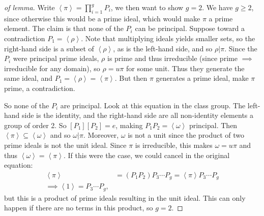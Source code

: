 \begin{proof}[of lemma]

Write \(\left\langle{ \pi }\right\rangle= \prod_{i=1}^g P_i\), we then
want to show \(g=2\). We have \(g\geq 2\), since otherwise this would be
a prime ideal, which would make \(\pi\) a prime element. The claim is
that none of the \(P_i\) can be principal. Suppose toward a
contradiction \(P_1 = \left\langle{ \rho }\right\rangle\). Note that
multiplying ideals yields smaller sets, so the right-hand side is a
subset of \(\left\langle{ \rho }\right\rangle\), as is the left-hand
side, and so \(\rho \mathrel{\Big|}\pi\). Since the \(P_i\) were
principal prime ideals, \(\rho\) is prime and thus irreducible (since
prime \(\implies\) irreducible for any domain), so \(\rho = u \pi\) for
some unit. Thus they generate the same ideal, and
\(P_1 = \left\langle{ \rho }\right\rangle = \left\langle{ \pi }\right\rangle\).
But then \(\pi\) generates a prime ideal, make \(\pi\) prime, a
contradiction.

So none of the \(P_i\) are principal. Look at this equation in the class
group. The left-hand side is the identity, and the right-hand side are
all non-identity elements a group of order 2. So \([P_1][P_2] = e\),
making \(P_1 P_2 = \left\langle{ \omega }\right\rangle\) principal. Then
\(\left\langle{ \pi }\right\rangle\subseteq \left\langle{ \omega }\right\rangle\)
and so \(\omega \mathrel{\Big|}\pi\). Moreover, \(\omega\) is not a unit
since the product of two prime ideals is not the unit ideal. Since
\(\pi\) is irreducible, this makes \(\omega= u \pi\) and thus
\(\left\langle{ \omega }\right\rangle = \left\langle{ \pi }\right\rangle\).
If this were the case, we could cancel in the original equation:
\begin{align*}
\left\langle{ \pi }\right\rangle &= (P_1 P_2)P_3 \cdots P_g = \left\langle{ \pi }\right\rangle P_3 \cdots P_g   \\
\implies \left\langle{ 1 }\right\rangle = P_3 \cdots P_g 
,\end{align*}
but this is a product of prime ideals resulting in the unit ideal. This
can only happen if there are no terms in this product, so \(g=2\).

\end{proof}

